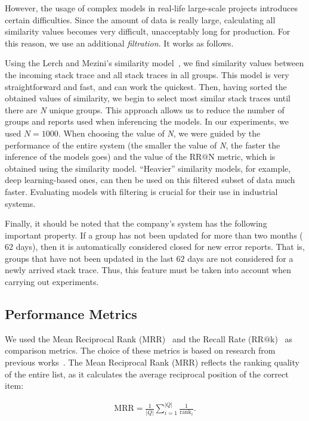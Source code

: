 However, the usage of complex models in real-life large-scale projects introduces certain difficulties. Since the amount of data is really large, calculating all similarity values becomes very difficult, unacceptably long for production. For this reason, we use an additional \textit{filtration}. It works as follows.

Using the Lerch and Mezini's similarity model~\cite{lerch}, we find similarity values between the incoming stack trace and all stack traces in all groups. This model is very straightforward and fast, and can work the quickest. Then, having sorted the obtained values of similarity, we begin to select most similar stack traces until there are \textit{N} unique groups. This approach allows us to reduce the number of groups and reports used when inferencing the models. In our experiments, we used $N = 1000$. When choosing the value of \textit{N}, we were guided by the performance of the entire system (the smaller the value of \textit{N}, the faster the inference of the models goes) and the value of the $\mathrm{RR@N}$ metric, which is obtained using the similarity model. ``Heavier'' similarity models, for example, deep learning-based ones, can then be used on this filtered subset of data much faster. Evaluating models with filtering is crucial for their use in industrial systems.

Finally, it should be noted that the company's system has the following important property. If a group has not been updated for more than two months ($62$ days), then it is automatically considered closed for new error reports. That is, groups that have not been updated in the last $62$ days are not considered for a newly arrived stack trace. Thus, this feature must be taken into account when carrying out experiments.

\subsection{Performance Metrics}



We used the Mean Reciprocal Rank ($\mathrm{MRR}$)~\cite{mrr} and the Recall Rate ($\mathrm{RR@k}$)~\cite{rr} as comparison metrics. The choice of these metrics is based on research from previous works~\cite{lerch,durfex,irving}. The Mean Reciprocal Rank (MRR) reflects the ranking quality of the entire list, as it calculates the average reciprocal position of the correct item:

\begin{gather}
    \mathrm{MRR} = \frac{1}{|Q|}\sum\limits_{i=1}^{|Q|}\frac{1}{\mathrm{rank}_i}.
\end{gather}

